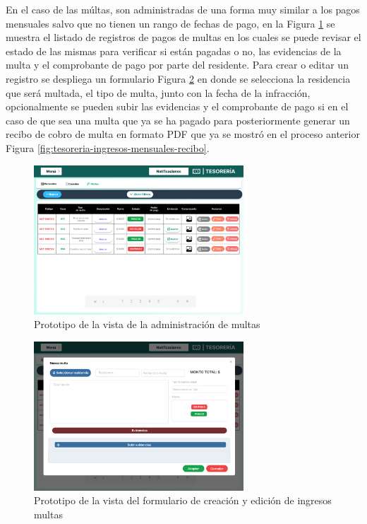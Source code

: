 En el caso de las múltas, son administradas de una forma muy similar a los pagos mensuales salvo que no tienen un rango de fechas de pago, en la Figura \ref{fig:tesoreria-ingresos-multas} se muestra el listado de registros de pagos de multas en los cuales se puede revisar el estado de las mismas para verificar si están pagadas o no, las evidencias de la multa y el comprobante de pago por parte del residente.
Para crear o editar un registro se despliega un formulario Figura \ref{fig:tesoreria-ingresos-multas-formulario} en donde se selecciona la residencia que será multada, el tipo de multa, junto con la fecha de la infracción, opcionalmente se pueden subir las evidencias y el comprobante de pago si en el caso de que sea una multa que ya se ha pagado para posteriormente generar un recibo de cobro de multa en formato PDF que ya se mostró en el proceso anterior Figura \ref{fig:tesoreria-ingresos-mensuales-recibo}.

\begin{figure}[H]
    \centering
    \includegraphics[width=0.7\textwidth]{resources/images/tesoreia - ingresos - multas}
    \caption{Prototipo de la vista de la administración de multas}
    \label{fig:tesoreria-ingresos-multas}
\end{figure}

\begin{figure}[H]
    \centering
    \includegraphics[width=0.7\textwidth]{resources/images/tesoreia - ingresos - multas -formulario}
    \caption{Prototipo de la vista del formulario de creación y edición de ingresos multas}
    \label{fig:tesoreria-ingresos-multas-formulario}
\end{figure}

